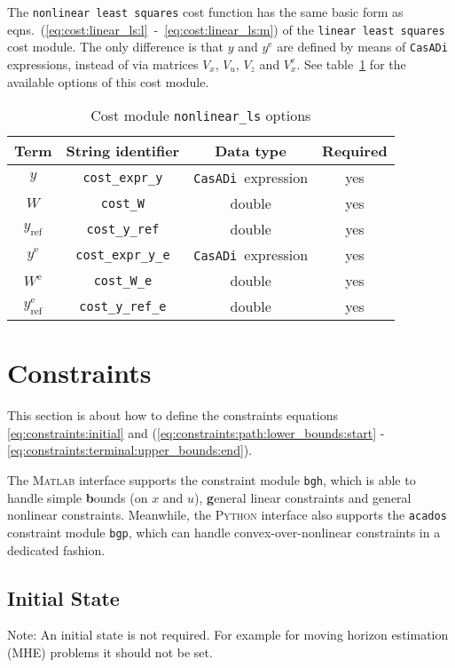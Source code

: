 \documentclass[
a4paper, %
10pt, %
notitlepage,
english]{CSUniSchoolLabReport}
\newcommand{\code}[1]{\texttt{#1}}
\newcommand{\casadi}{\texttt{CasADi}}
\newcommand{\acados}{\texttt{acados}}
\newcommand{\matlab}{\textsc{Matlab}}
\newcommand{\python}{\textsc{Python}}
\newcommand{\ind}[1]{_{\textrm{#1}}}
\newcommand{\terminal}{^{\textrm{e}}}
\newcommand{\mandatory}{yes}
\begin{document}
\begin{appendices}
The \code{nonlinear least squares} cost function has the same basic form as eqns.~(\ref{eq:cost:linear_ls:l}~-~\ref{eq:cost:linear_ls:m}) of the \code{linear least squares} cost module.
The only difference is that $ y $ and $ y\terminal $ are defined by means of \casadi{} expressions, instead of via matrices $ V_x $, $ V_u $, $ V_z $ and $ V_x\terminal $.
%
See table~\ref{tab:cost:nonlinear_ls} for the available options of this cost module.
%
\begin{table}[h!]
	\centering
	\caption{Cost module \code{nonlinear\_ls} options} \label{tab:cost:nonlinear_ls}
	\begin{tabular}{cccc}
		\toprule
		Term & String identifier & Data type & Required \\ \midrule
		$ y $ & \code{cost\_expr\_y}    & \casadi~expression  & \mandatory   \\
		$ W $ & \code{cost\_W}    & double  & \mandatory   \\
		$ y\ind{ref} $ & \code{cost\_y\_ref}    & double & \mandatory    \\ [1em]
		$ y\terminal $ & \code{cost\_expr\_y\_e}    & \casadi~expression  & \mandatory   \\
		$ W\terminal $ & \code{cost\_W\_e}    & double & \mandatory   \\
		$ y\ind{ref}\terminal $ & \code{cost\_y\_ref\_e}    & double  & \mandatory   \\
		\bottomrule
	\end{tabular}
\end{table}
%
\section{Constraints}\label{sec:constraints}
%
This section is about how to define the constraints equations \eqref{eq:constraints:initial} and (\ref{eq:constraints:path:lower_bounds:start} - \ref{eq:constraints:terminal:upper_bounds:end}).

The \matlab{} interface supports the constraint module \code{bgh}, which is able to handle simple \textbf{b}ounds (on $ x $ and $ u $), \textbf{g}eneral linear constraints and general nonlinear constraints.
Meanwhile, the \python{} interface also supports the \acados{} constraint module \code{bgp}, which can handle convex-over-nonlinear constraints in a dedicated fashion.
%
\subsection{Initial State}\label{sec:constraints:initial}
%
Note: An initial state is not required.
For example for moving horizon estimation (MHE) problems it should not be set.


\end{appendices}
\end{document}
